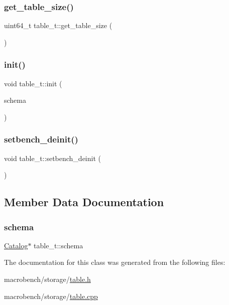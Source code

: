 \subsubsection{\texorpdfstring{get\+\_\+table\+\_\+size()}{get\_table\_size()}}
{\footnotesize\ttfamily uint64\+\_\+t table\+\_\+t\+::get\+\_\+table\+\_\+size (\begin{DoxyParamCaption}{ }\end{DoxyParamCaption})\hspace{0.3cm}{\ttfamily [inline]}}

\mbox{\label{classtable__t_a5fd9dca2e5f3dcb70c462f3eb94dd2be}} 
\subsubsection{\texorpdfstring{init()}{init()}}
{\footnotesize\ttfamily void table\+\_\+t\+::init (\begin{DoxyParamCaption}\item[{\hyperlink{classCatalog}{Catalog} $\ast$}]{schema }\end{DoxyParamCaption})}

\mbox{\label{classtable__t_a9ec2af3a52db280d8c1c6a78bee7cbd0}} 
\subsubsection{\texorpdfstring{setbench\+\_\+deinit()}{setbench\_deinit()}}
{\footnotesize\ttfamily void table\+\_\+t\+::setbench\+\_\+deinit (\begin{DoxyParamCaption}{ }\end{DoxyParamCaption})}



\subsection{Member Data Documentation}
\mbox{\label{classtable__t_a5e2b3478c29080f6106331294d94c06a}} 
\subsubsection{\texorpdfstring{schema}{schema}}
{\footnotesize\ttfamily \hyperlink{classCatalog}{Catalog}$\ast$ table\+\_\+t\+::schema}



The documentation for this class was generated from the following files\+:\begin{DoxyCompactItemize}
\item 
macrobench/storage/\hyperlink{table_8h}{table.\+h}\item 
macrobench/storage/\hyperlink{table_8cpp}{table.\+cpp}\end{DoxyCompactItemize}
